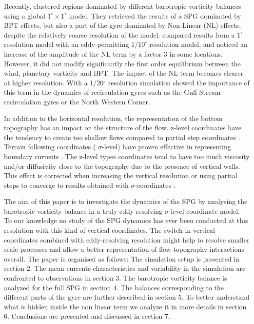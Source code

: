 \documentclass{ametsoc}
\begin{document}
Recently, \citet{sonnewald2019} clustered regions dominated by different barotropic vorticity balances using a global $1^{\circ} \times 1^{\circ}$ model. They retrieved the results of a SPG dominated by BPT effects, but also a part of the gyre dominated by Non-Linear (NL) effects, despite the relatively coarse resolution of the model. \citet{yeager2015} compared results from a $1^{\circ}$ resolution model with an eddy-permitting $1/10^{\circ}$ resolution model, and noticed an increase of the amplitude of the NL term by a factor 3 in some locations. However, it did not modify significantly the first order equilibrium between the wind, planetary vorticity and BPT.  The impact of the NL term becomes clearer at higher resolution. With a 1/20$^{\circ}$ resolution simulation \citet{wang2017} showed the importance of this term in the dynamics of recirculation gyres such as the Gulf Stream recirculation gyres or the North Western Corner. 

In addition to the horizontal resolution, the representation of the bottom topography has an impact on the structure of the flow. z-level coordinates have the tendency to create too shallow flows compared to partial step coordinates \citep{pacanowski1998}. Terrain following coordinates ( $\sigma$-level) have proven effective in representing boundary currents \citep{schoonover2016,ezer2016}. The z-level types coordinates tend to have too much viscosity and/or diffusivity close to the topography due to the presence of vertical walls. This effect is corrected when increasing the vertical resolution or using partial steps to converge to results obtained with $\sigma$-coordinates \citep{ezer2004}.%


The aim of this paper is to investigate the dynamics of the SPG by analysing the barotropic vorticity balance in a truly eddy-resolving $\sigma$-level coordinate model. To our knowledge no study of the SPG dynamics has ever been conducted at this resolution with this kind of vertical coordinates. The switch in vertical coordinates combined with eddy-resolving resolution might help to resolve smaller scale processes and allow a better representation of  flow-topography interactions overall. The paper is organised as follows: The simulation setup is presented in section 2. The mean currents characteristics and variability in the simulation are confronted to observations in section 3. The barotropic vorticity balance is analyzed for the full SPG in section 4. The balances corresponding to the different parts of the gyre are further described in section 5. To better understand what is hidden inside the non linear term we analyze it in more details in section 6. Conclusions are presented and discussed in section 7.       
\end{document}
